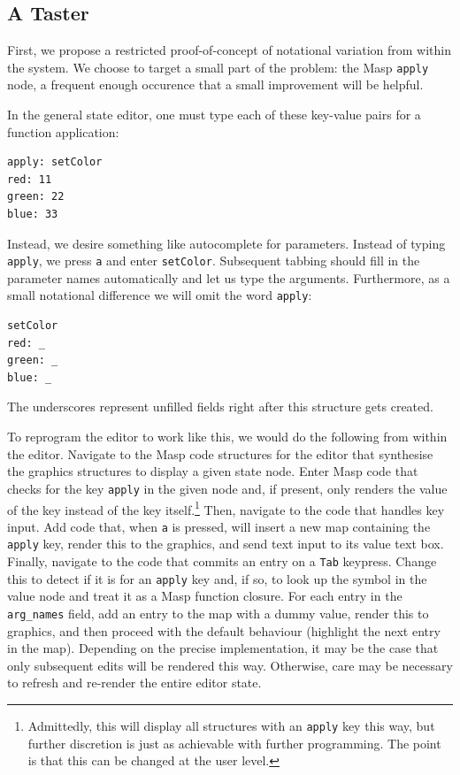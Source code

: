 \documentclass[ twoside,openright,titlepage,numbers=noenddot,headinclude,footinclude,cleardoublepage=empty,abstract=on,
                BCOR=5mm,paper=a4,fontsize=11pt
                ]{scrreprt}
\theoremstyle{definition}
\begin{document}
\hypertarget{a-taster}{\subsection{A Taster}\label{a-taster}}

First, we propose a restricted proof-of-concept of notational variation
from within the system. We choose to target a small part of the problem:
the Masp \texttt{apply} node, a frequent enough occurence that a small
improvement will be helpful.

In the general state editor, one must type each of these key-value pairs
for a function application:

\begin{verbatim}
apply: setColor
red: 11
green: 22
blue: 33
\end{verbatim}

Instead, we desire something like autocomplete for parameters. Instead
of typing \texttt{apply}, we press \texttt{a} and enter
\texttt{setColor}. Subsequent tabbing should fill in the parameter names
automatically and let us type the arguments. Furthermore, as a small
notational difference we will omit the word \texttt{apply}:

\begin{verbatim}
setColor
red: _
green: _
blue: _
\end{verbatim}

The underscores represent unfilled fields right after this structure
gets created.

To reprogram the editor to work like this, we would do the following
from within the editor. Navigate to the Masp code structures for the
editor that synthesise the graphics structures to display a given state
node. Enter Masp code that checks for the key \texttt{apply} in the
given node and, if present, only renders the value of the key instead of
the key itself.\footnote{Admittedly, this will display all structures
  with an \texttt{apply} key this way, but further discretion is just as
  achievable with further programming. The point is that this can be
  changed at the user level.} Then, navigate to the code that handles
key input. Add code that, when \texttt{a} is pressed, will insert a new
map containing the \texttt{apply} key, render this to the graphics, and
send text input to its value text box. Finally, navigate to the code
that commits an entry on a \texttt{Tab} keypress. Change this to detect
if it is for an \texttt{apply} key and, if so, to look up the symbol in
the value node and treat it as a Masp function closure. For each entry
in the \texttt{arg\_names} field, add an entry to the map with a dummy
value, render this to graphics, and then proceed with the default
behaviour (highlight the next entry in the map). Depending on the
precise implementation, it may be the case that only subsequent edits
will be rendered this way. Otherwise, care may be necessary to refresh
and re-render the entire editor state.
\end{document}
